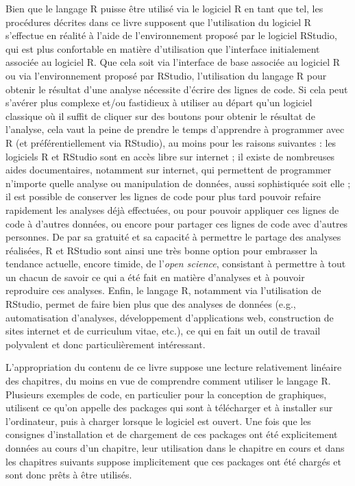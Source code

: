 \documentclass[
  french,
]{book}
\begin{document}
Bien que le langage R puisse être utilisé via le logiciel R en tant que tel, les procédures décrites dans ce livre supposent que l'utilisation du logiciel R s'effectue en réalité à l'aide de l'environnement proposé par le logiciel RStudio, qui est plus confortable en matière d'utilisation que l'interface initialement associée au logiciel R. Que cela soit via l'interface de base associée au logiciel R ou via l'environnement proposé par RStudio, l'utilisation du langage R pour obtenir le résultat d'une analyse nécessite d'écrire des lignes de code. Si cela peut s'avérer plus complexe et/ou fastidieux à utiliser au départ qu'un logiciel classique où il suffit de cliquer sur des boutons pour obtenir le résultat de l'analyse, cela vaut la peine de prendre le temps d'apprendre à programmer avec R (et préférentiellement via RStudio), au moins pour les raisons suivantes : les logiciels R et RStudio sont en accès libre sur internet ; il existe de nombreuses aides documentaires, notamment sur internet, qui permettent de programmer n'importe quelle analyse ou manipulation de données, aussi sophistiquée soit elle ; il est possible de conserver les lignes de code pour plus tard pouvoir refaire rapidement les analyses déjà effectuées, ou pour pouvoir appliquer ces lignes de code à d'autres données, ou encore pour partager ces lignes de code avec d'autres personnes. De par sa gratuité et sa capacité à permettre le partage des analyses réalisées, R et RStudio sont ainsi une très bonne option pour embrasser la tendance actuelle, encore timide, de l'\emph{open science}, consistant à permettre à tout un chacun de savoir ce qui a été fait en matière d'analyses et à pouvoir reproduire ces analyses. Enfin, le langage R, notamment via l'utilisation de RStudio, permet de faire bien plus que des analyses de données (e.g., automatisation d'analyses, développement d'applications web, construction de sites internet et de curriculum vitae, etc.), ce qui en fait un outil de travail polyvalent et donc particulièrement intéressant.

L'appropriation du contenu de ce livre suppose une lecture relativement linéaire des chapitres, du moins en vue de comprendre comment utiliser le langage R. Plusieurs exemples de code, en particulier pour la conception de graphiques, utilisent ce qu'on appelle des packages qui sont à télécharger et à installer sur l'ordinateur, puis à charger lorsque le logiciel est ouvert. Une fois que les consignes d'installation et de chargement de ces packages ont été explicitement données au cours d'un chapitre, leur utilisation dans le chapitre en cours et dans les chapitres suivants suppose implicitement que ces packages ont été chargés et sont donc prêts à être utilisés.
\end{document}
